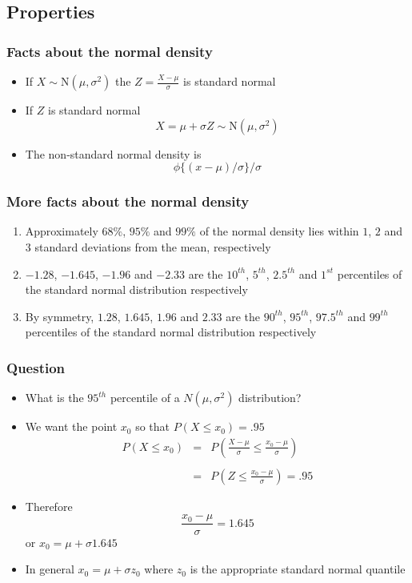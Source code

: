 \documentclass[aspectratio=169]{beamer}
\begin{document}
\subsection{Properties}
\begin{frame}\frametitle{Facts about the normal density}
\begin{itemize}
\item If $X \sim \mbox{N}(\mu,\sigma^2)$ the $Z = \frac{X -\mu}{\sigma}$ is standard normal
\item If $Z$ is standard normal $$X = \mu + \sigma Z \sim \mbox{N}(\mu, \sigma^2)$$
\item The non-standard normal density is $$\phi\{(x - \mu) / \sigma\}/\sigma$$
\end{itemize}
\end{frame}

\begin{frame}\frametitle{More facts about the normal density}
  \begin{enumerate}
  \item Approximately $68\%$, $95\%$ and $99\%$  of the normal density lies within
    $1$, $2$ and $3$ standard deviations from the mean, respectively
  \item $-1.28$, $-1.645$, $-1.96$ and $-2.33$ are the $10^{th}$, $5^{th}$, $2.5^{th}$ and $1^{st}$
    percentiles of the standard normal distribution respectively
  \item By symmetry, $1.28$, $1.645$, $1.96$ and $2.33$ are the $90^{th}$,
    $95^{th}$, $97.5^{th}$ and $99^{th}$ percentiles of the standard normal
    distribution respectively
  \end{enumerate}
\end{frame}

\begin{frame}\frametitle{Question}
\begin{itemize}
\item What is the $95^{th}$ percentile of a $N(\mu, \sigma^2)$ distribution?
\item We want the point $x_0$ so that $P(X \leq x_0) = .95$
  \begin{eqnarray*}
    P(X \leq x_0) & = & P\left(\frac{X - \mu}{\sigma} \leq \frac{x_0 - \mu}{\sigma}\right) \\ \\
                  & = & P\left(Z \leq \frac{x_0 - \mu}{\sigma}\right) =  .95
  \end{eqnarray*}
\item Therefore
  $$\frac{x_0 - \mu}{\sigma} = 1.645$$
  or $x_0 = \mu + \sigma 1.645$
\item In general $x_0 = \mu + \sigma z_0$ where $z_0$ is the appropriate standard normal quantile
\end{itemize}
\end{frame}
\end{document}
